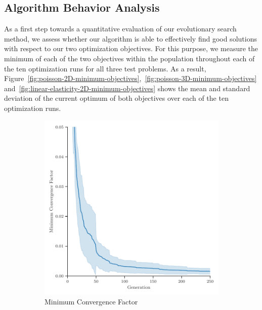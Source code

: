 \subsection{Algorithm Behavior Analysis}
As a first step towards a quantitative evaluation of our evolutionary search method, we assess whether our algorithm is able to effectively find good solutions with respect to our two optimization objectives.
For this purpose, we measure the minimum of each of the two objectives within the population throughout each of the ten optimization runs for all three test problems.
As a result, Figure~\ref{fig:poisson-2D-minimum-objectives},~\ref{fig:poisson-3D-minimum-objectives} and~\ref{fig:linear-elasticity-2D-minimum-objectives} shows the mean and standard deviation of the current optimum of both objectives over each of the ten optimization runs.
\begin{figure}
	\centering
	\begin{subfigure}[b]{0.49\textwidth}
		\centering
		\includegraphics[width=\textwidth]{figures/minimum_convergence_factor_2D_FD_Poisson_fromL2.pdf}
		\caption{Minimum Convergence Factor}
		\label{fig:poisson-2D-minimum-convergence-factor}
	\end{subfigure}
	\hfill
	\begin{subfigure}[b]{0.49\textwidth}
		\centering

\end{subfigure}
\end{figure}
